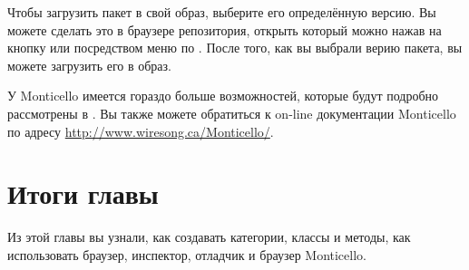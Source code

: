 \documentclass[a4paper,10pt,twoside]{book}
\begin{document}

Чтобы загрузить пакет в свой образ, выберите его определённую версию. Вы можете сделать это в браузере репозитория, открыть который можно нажав на кнопку  или посредством меню по \actclick. После того, как вы выбрали верию пакета, вы можете загрузить его в образ.


У Monticello имеется гораздо больше возможностей, которые будут подробно рассмотрены в .
Вы также можете обратиться к on-line документации Monticello по адресу \url{http://www.wiresong.ca/Monticello/}.

\section{Итоги главы}
Из этой главы вы узнали, как создавать категории, классы и методы, как использовать браузер, инспектор, отладчик и браузер Monticello.
\end{document}
